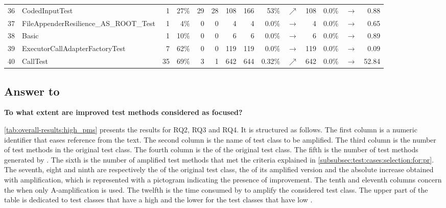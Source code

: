 \begin{table}
\begin{tabular}{|llrrrr|rrrr|rrr|r|}
		\rowcolor[HTML]{EFEFEF}
		36&\scriptsize{CodedInputTest}&1&27\%&29&28&108&166&53\%&{\color{ForestGreen}$\nearrow$}&108&0.0\%&$\rightarrow$&0.88 \\
		37&\scriptsize{FileAppenderResilience\_AS\_ROOT\_Test}&1&4\%&0&0&4&4&0.0\%&$\rightarrow$&4&0.0\%&$\rightarrow$&0.65 \\
		\rowcolor[HTML]{EFEFEF}
		38&\scriptsize{Basic}&1&10\%&0&0&6&6&0.0\%&$\rightarrow$&6&0.0\%&$\rightarrow$&0.89 \\
		39&\scriptsize{ExecutorCallAdapterFactoryTest}&7&62\%&0&0&119&119&0.0\%&$\rightarrow$&119&0.0\%&$\rightarrow$&0.09 \\
		\rowcolor[HTML]{EFEFEF}
		40&\scriptsize{CallTest}&35&69\%&3&1&642&644&0.32\%&{\color{ForestGreen}$\nearrow$}&642&0.0\%&$\rightarrow$&52.84 \\
		\hline
	\end{tabular}
\end{table}


\subsection{Answer to \rqcandidates{}}

\textbf{\rqcandidates{} To what extent are improved test methods considered as focused?}

\autoref{tab:overall-results:high_pms}
presents the results for RQ2, RQ3 and RQ4.%
It is structured as follows.
The first column is a numeric identifier that eases reference from the text.
The second column is the name of test class to be amplified.
The third column is the number of test methods in the original test class.
The fourth column is the \ms of the original test class.
The fifth is the number of test methods generated by \dspot.
The sixth is the number of amplified test methods that met the criteria explained in \autoref{subsubsec:test:cases:selection:for:pr}.
The seventh, eight and ninth are respectively the \ams of the original test class, the \ams of its amplified version and the absolute increase obtained with amplification, which is represented with a pictogram indicating the presence of improvement. 
The tenth and eleventh columns concern the \ams when only A-amplification is used.
The twelfth is the time consumed by \dspot to amplify the considered test class. 
The upper part of the table is dedicated to test classes that have a high \ms and the lower for the test classes that have low \ms.

